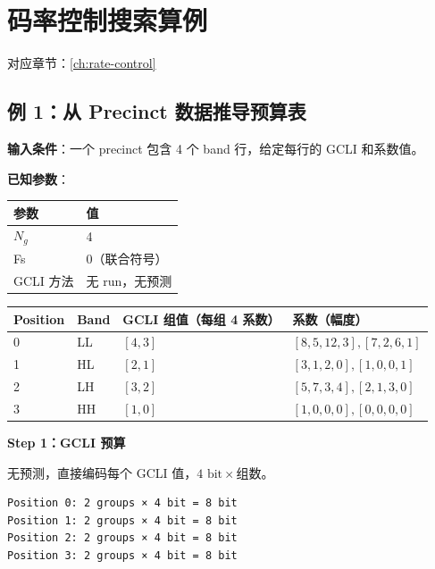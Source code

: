 
\section{码率控制搜索算例}\label{sec:rc-examples}

对应章节：\cref{ch:rate-control}

\subsection{例 1：从 Precinct 数据推导预算表}

\begin{examplebox}[title={RC Worked Example 1：从 Precinct 数据推导预算表}]

\textbf{输入条件}：一个 precinct 包含 4 个 band 行，给定每行的 GCLI 和系数值。

\textbf{已知参数}：

\begin{tabular}{@{}ll@{}}
\toprule
参数 & 值 \\
\midrule
$N_g$ & 4 \\
Fs & 0（联合符号） \\
GCLI 方法 & 无 run，无预测 \\
\bottomrule
\end{tabular}

\begin{tabular}{@{}llll@{}}
\toprule
Position & Band & GCLI 组值（每组 4 系数） & 系数（幅度） \\
\midrule
0 & LL & $[4, 3]$ & $[8, 5, 12, 3], [7, 2, 6, 1]$ \\
1 & HL & $[2, 1]$ & $[3, 1, 2, 0], [1, 0, 0, 1]$ \\
2 & LH & $[3, 2]$ & $[5, 7, 3, 4], [2, 1, 3, 0]$ \\
3 & HH & $[1, 0]$ & $[1, 0, 0, 0], [0, 0, 0, 0]$ \\
\bottomrule
\end{tabular}

\textbf{Step 1：GCLI 预算}

无预测，直接编码每个 GCLI 值，$4 \text{ bit} \times \text{组数}$。

\begin{lstlisting}[numbers=none]
Position 0: 2 groups × 4 bit = 8 bit
Position 1: 2 groups × 4 bit = 8 bit
Position 2: 2 groups × 4 bit = 8 bit
Position 3: 2 groups × 4 bit = 8 bit
\end{lstlisting}


\end{examplebox}
